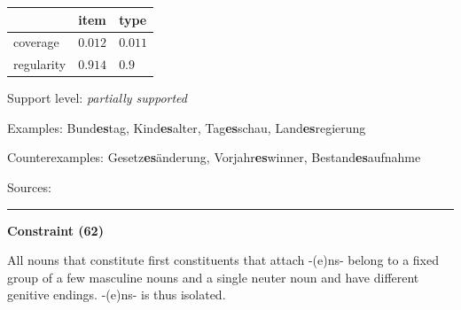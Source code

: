 \vspace{-0.25em}

\begin{table}[!ht]
\begin{center}
\setlength{\extrarowheight}{1pt}
\begin{tabularx}{\columnwidth}{|X|X|X|}
\hline
 & item & type \\
\hline
 coverage & $0.012$ & $0.011$ \\
\hline
 regularity & $0.914$ & $0.9$ \\
\hline
\end{tabularx}
\end{center}
\end{table}

\vspace{-1.35em}

\noindent
Support level: \textit{partially supported}

\vspace{0.3em}

\noindent
Examples: Bund\textbf{es}tag, Kind\textbf{es}alter, Tag\textbf{es}schau, Land\textbf{es}regierung

\noindent
Counterexamples: Gesetz\textbf{es}änderung, Vorjahr\textbf{es}winner, Bestand\textbf{es}aufnahme

\vspace{0.3em}

\noindent
Sources: \citet[11, 18]{kuerschner_2010}

\vspace{0.35em}
\hrule




\vspace{0.4em}

\begin{center}
\textbf{Constraint (62)}
\end{center}

\noindent
All nouns that constitute first constituents that attach -(e)ns- belong to a fixed group of a few masculine nouns and a single neuter noun and have different genitive endings. -(e)ns- is thus isolated.
\vspace{0.5em}


